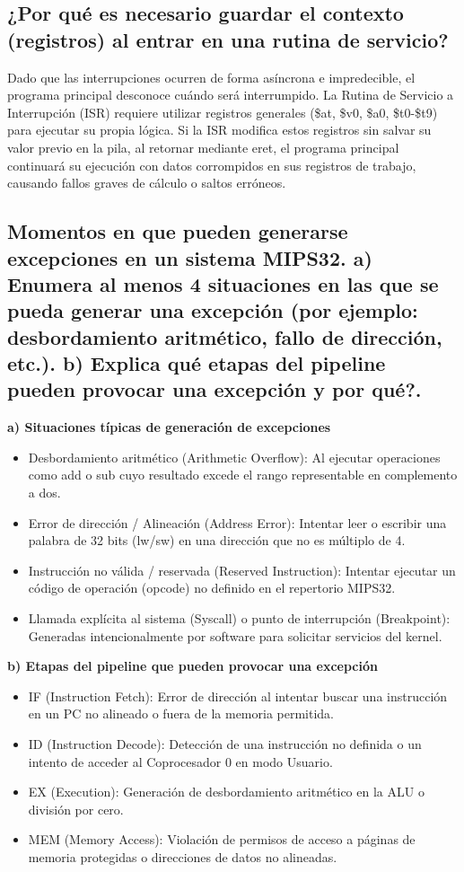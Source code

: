 \documentclass[12pt, a4paper]{article}
\begin{document}
\subsection{¿Por qué es necesario guardar el contexto (registros) al entrar en una rutina de servicio?}
    Dado que las interrupciones ocurren de forma asíncrona e impredecible, el programa principal desconoce cuándo será interrumpido. La Rutina de Servicio a Interrupción (ISR) requiere utilizar registros generales (\$at, \$v0, \$a0, \$t0-\$t9) para ejecutar su propia lógica. Si la ISR modifica estos registros sin salvar su valor previo en la pila, al retornar mediante eret, el programa principal continuará su ejecución con datos corrompidos en sus registros de trabajo, causando fallos graves de cálculo o saltos erróneos.
    
\subsection{Momentos en que pueden generarse excepciones en un sistema MIPS32. a) Enumera al menos 4 situaciones en las que se pueda generar una excepción (por ejemplo: desbordamiento aritmético, fallo de dirección, etc.). b) Explica qué etapas del pipeline pueden provocar una excepción y por qué?.}
    \textbf{a) Situaciones típicas de generación de excepciones}
    \begin{itemize}
        \item Desbordamiento aritmético (Arithmetic Overflow): Al ejecutar operaciones como add o sub cuyo resultado excede el rango representable en complemento a dos.
        \item Error de dirección / Alineación (Address Error): Intentar leer o escribir una palabra de 32 bits (lw/sw) en una dirección que no es múltiplo de 4.
        \item Instrucción no válida / reservada (Reserved Instruction): Intentar ejecutar un código de operación (opcode) no definido en el repertorio MIPS32.
        \item Llamada explícita al sistema (Syscall) o punto de interrupción (Breakpoint): Generadas intencionalmente por software para solicitar servicios del kernel.
    \end{itemize}
    \textbf{b) Etapas del pipeline que pueden provocar una excepción}
    \begin{itemize}
        \item IF (Instruction Fetch): Error de dirección al intentar buscar una instrucción en un PC no alineado o fuera de la memoria permitida.
        \item ID (Instruction Decode): Detección de una instrucción no definida o un intento de acceder al Coprocesador 0 en modo Usuario.
        \item EX (Execution): Generación de desbordamiento aritmético en la ALU o división por cero.
        \item MEM (Memory Access): Violación de permisos de acceso a páginas de memoria protegidas o direcciones de datos no alineadas.
    \end{itemize}
\end{document}
